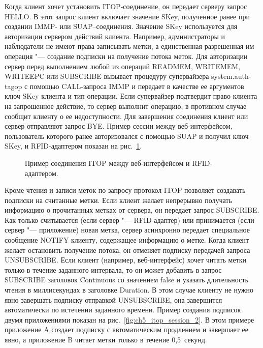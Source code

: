 Когда клиент хочет установить ITOP-соединение, он передает серверу запрос HELLO. В этот запрос клиент включает значение SKey, полученное ранее при создании IMMP- или SUAP--соединения. Значение SKey используется для авторизации сервером действий клиента. Например, администраторы и наблюдатели не имеют права записывать метки, а единственная разрешенная им операция "--- создание подписки на получение потока меток. Для авторизации сервер перед выполнением любой из операций READMEM, WRITEMEM, WRITEEPC или SUBSCRIBE вызывает процедуру супервайзера system.auth-tagop с помощью CALL-запроса IMMP и передает в качестве ее аргументов ключ SKey клиента и тип операции. Если супервайзер подтвердит право клиента на запрошенное действие, то сервер выполнит операцию, в противном случае сообщит клиенту о ее недоступности. Для завершения соединения клиент или сервер отправляют запрос BYE. Пример сессии между веб-интерфейсом, пользователь которого ранее авторизовался с помощью SUAP и получил ключ SKey, и RFID-адаптером показан на рис.~\ref{fig:ch5_itop_session_1}.

\begin{figure}[ht]
  \caption{Пример соединения ITOP между веб-интерфейсом и RFID-адаптером.}
  \label{fig:ch5_itop_session_1}
\end{figure}

Кроме чтения и записи меток по запросу протокол ITOP позволяет создавать подписки на считанные метки. Если клиент желает непрерывно получать информацию о прочитанных метках от сервера, он передает запрос SUBSCRIBE. Как только считывается (если сервер "--- RFID-адаптер) или принимается (если сервер "--- приложение) новая метка, сервер асинхронно передает специальное сообщение NOTIFY клиенту, содержащее информацию о метке. Когда клиент желает остановить получение потока, он отменяет подписку передачей запроса UNSUBSCRIBE. Если клиент (например, веб-интерфейс) хочет читать метки только в течение заданного интервала, то он может добавить в запрос SUBSCRIBE заголовок Continuous со значением false и указать длительность чтения в миллисекундах в заголовке Duration. В этом случае клиенту не нужно явно завершать подписку отправкой UNSUBSCRIBE, она завершится автоматически по истечении заданного времени. Пример создания подписок двумя приложениями показан на рис.~\ref{fig:ch5_itop_session_2}. В этом примере приложение A создает подписку с автоматическим продлением и завершает ее явно, а приложение B читает метки только в течение 0,5~секунд.


